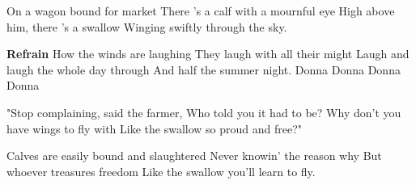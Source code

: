 \footnotemark [
ititle={Donna Donna}]


\beginverse
On a wagon bound for market
There 's a calf with a mournful eye
High above him, there 's a swallow
Winging swiftly through the sky.
\endverse

\beginchorus
\textbf{Refrain}
How the winds are laughing
They laugh with all their might
Laugh and laugh the whole day through
And half the summer night.
{Donna Donna Donna Donna}
\endchorus

\beginverse
"Stop complaining, said the farmer,
Who told you it had to be?
Why don't you have wings to fly with
Like the swallow so proud and free?"
\endverse

\beginverse
Calves are easily bound and slaughtered
Never knowin' the reason why
But whoever treasures freedom
Like the swallow you'll learn to fly.
\endverse
\endsong